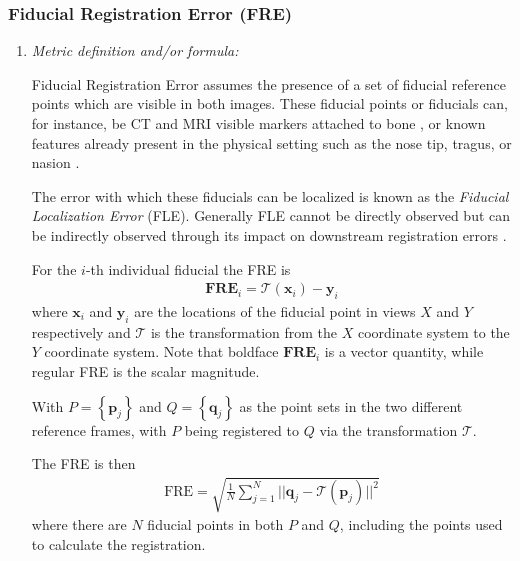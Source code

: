 \documentclass[a4paper,11pt]{article}
\begin{document}
        \subsubsection{Fiducial Registration Error (FRE)}
            \begin{enumerate}[label=\alph*.]
                \item \textit{Metric definition and/or formula:}
                

                Fiducial Registration Error assumes the presence of a set of fiducial reference points which are visible in both images. These fiducial points or fiducials can, for instance, be CT and MRI visible markers attached to bone \cite{maurer1997registration}, or known features already present in the physical setting such as the nose tip, tragus, or nasion \cite{fitzpatrick2010role}. 

                The error with which these fiducials can be localized is known as the \textit{Fiducial Localization Error} (FLE). Generally FLE cannot be directly observed but can be indirectly observed through its impact on downstream registration errors \cite{fitzpatrick2000image}. 

                For the $i$-th individual fiducial the FRE is 
                \begin{align}
                    \textbf{FRE}_i = \mathcal{T}\left(\mathbf{x}_i\right) - \mathbf{y}_i
                \end{align}
                where $\mathbf{x}_i$ and $\mathbf{y}_i$ are the locations of the fiducial point in views $X$ and $Y$ respectively and $\mathcal{T}$ is the transformation from the $X$ coordinate system to the $Y$ coordinate system. Note that boldface $\textbf{FRE}_i$ is a vector quantity, while regular FRE is the scalar magnitude.
                
                

                With $P = \left\{\mathbf{p}_j\right\}$ and $Q = \left\{\mathbf{q}_j\right\}$ as the point sets in the two different reference frames, with $P$ being registered to $Q$ via the transformation $\mathcal{T}$.

                The FRE is then 
                \begin{align}
                    \mathrm{FRE} = \sqrt{
                        \frac{1}{N} \sum_{j=1}^{N} || \mathbf{q}_j - \mathcal{T}(\mathbf{p}_j) ||^2 \label{equation:fre}
                    }
                \end{align}
                where there are $N$ fiducial points in both $P$ and $Q$, including the points used to calculate the registration.


\end{enumerate}
\end{document}
